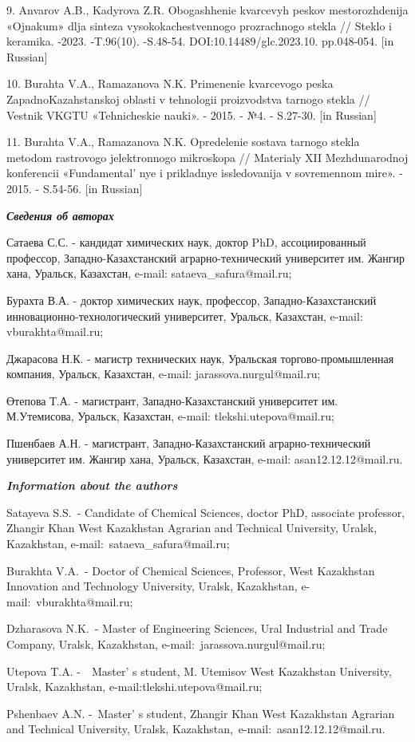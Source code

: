 \begin{refs}
9. Anvarov A.B., Kadyrova Z.R. Obogashhenie kvarcevyh peskov
mestorozhdenija «Ojnakum» dlja sinteza vysokokachestvennogo prozrachnogo
stekla // Steklo i keramika. -2023. -T.96(10). -S.48-54.
DOI:10.14489/glc.2023.10. pp.048-054. {[}in Russian{]}

10. Burahta V.A., Ramazanova N.K. Primenenie kvarcevogo peska
ZapadnoKazahstanskoj oblasti v tehnologii proizvodstva tarnogo stekla //
Vestnik VKGTU «Tehnicheskie nauki». - 2015. - №4. - S.27-30. {[}in
Russian{]}

11. Burahta V.A., Ramazanova N.K. Opredelenie sostava tarnogo stekla
metodom rastrovogo jelektronnogo mikroskopa // Materialy XII
Mezhdunarodnoj konferencii «Fundamental' nye i prikladnye
issledovanija v sovremennom mire». - 2015. - S.54-56. {[}in Russian{]}
\end{refs}

\begin{info}
\hspace{1em}\emph{{\bfseries Сведения об авторах}}

Сатаева С.С. - кандидат химических наук, доктор PhD, ассоциированный
профессор, Западно-Казахстанский аграрно-технический университет им.
Жангир хана, Уральск, Казахстан, e-mail: sataeva\_safura@mail.ru;

Бурахта В.А. - доктор химических наук, профессор,
Западно-Казахстанский инновационно-технологический университет,
Уральск, Казахстан, e-mail: vburakhta@mail.ru;

Джарасова Н.К. - магистр технических наук, Уральская
торгово-промышленная компания, Уральск, Казахстан, e-mail:
jarassova.nurgul@mail.ru;

Өтепова Т.А. - магистрант, Западно-Казахстанский университет им.
М.Утемисова, Уральск, Казахстан, e-mail: tlekshi.utepova@mail.ru;

Пшенбаев А.Н. - магистрант, Западно-Казахстанский аграрно-технический
университет им. Жангир хана, Уральск, Казахстан, e-mail:
asan12.12.12@mail.ru.

\hspace{1em}\emph{{\bfseries Information about the authors}}

Satayeva S.S.~- Candidate of Chemical Sciences, doctor PhD, associate
professor, Zhangir Khan West Kazakhstan Agrarian and Technical
University, Uralsk, Kazakhstan, e-mail:~sataeva\_safura@mail.ru;~

Burakhta V.A.~- Doctor of Chemical Sciences, Professor, West
Kazakhstan Innovation and Technology University, Uralsk, Kazakhstan,
e-mail:~vburakhta@mail.ru;~~

Dzharasova N.K.~- Master of Engineering Sciences, Ural Industrial and
Trade Company, Uralsk, Kazakhstan, e-mail:~jarassova.nurgul@mail.ru;~

Utepova T.A. -~~Master' s student, M. Utemisov West Kazakhstan
University, Uralsk, Kazakhstan, e-mail:tlekshi.utepova@mail.ru;~~

Pshenbaev A.N. -~Master' s student, Zhangir Khan West Kazakhstan
Agrarian and Technical University, Uralsk,
Kazakhstan,~e-mail:~asan12.12.12@mail.ru.
\end{info}
